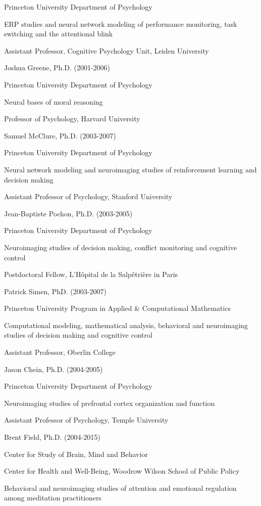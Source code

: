 \documentclass[10 pt]{article}
\begin{document}
Princeton University Department of Psychology

ERP studies and neural network modeling of performance monitoring, task switching and the attentional blink

Assistant Professor, Cognitive Psychology Unit, Leiden University
    \medskip

Joshua Greene, Ph.D. (2001-2006)

Princeton University Department of Psychology

Neural bases of moral reasoning

Professor of Psychology, Harvard University
    \medskip

Samuel McClure, Ph.D. (2003-2007)

Princeton University Department of Psychology

Neural network modeling and neuroimaging studies of reinforcement learning and decision making

Assistant Professor of Psychology, Stanford University
    \medskip

Jean-Baptiste Pochon, Ph.D. (2003-2005)

Princeton University Department of Psychology

Neuroimaging studies of decision making, conflict monitoring and cognitive control

Postdoctoral Fellow, L'Hôpital de la Salpêtrière in Paris
    \medskip

Patrick Simen, PhD. (2003-2007)

Princeton University Program in Applied \& Computational Mathematics

Computational modeling, mathematical analysis, behavioral and neuroimaging studies of decision making and cognitive control

Assistant Professor, Oberlin College
    \medskip

Jason Chein, Ph.D. (2004-2005)

Princeton University Department of Psychology

Neuroimaging studies of prefrontal cortex organization and function

Assistant Professor of Psychology, Temple University
    \medskip

Brent Field, Ph.D. (2004-2015)

Center for Study of Brain, Mind and Behavior

Center for Health and Well-Being, Woodrow Wilson School of Public Policy

Behavioral and neuroimaging studies of attention and emotional regulation among meditation practitioners
    \medskip
\end{document}
